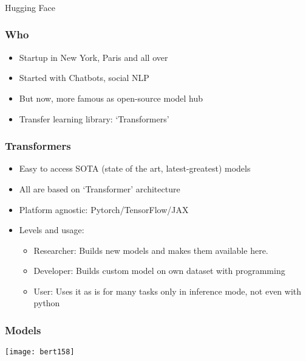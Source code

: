 \begin{frame}[fragile]\frametitle{}
\begin{center}
{\Large Hugging Face}
\end{center}
\end{frame}

\begin{frame}[fragile]\frametitle{Who}
		\begin{itemize}
		\item Startup in New York, Paris and all over
		\item Started with Chatbots, social NLP
		\item But now, more famous as open-source model hub
		\item Transfer learning library: `Transformers'
		\end{itemize}
\end{frame}

\begin{frame}[fragile]\frametitle{Transformers}
		\begin{itemize}
		\item Easy to access SOTA (state of the art, latest-greatest) models
		\item All are based on ‘Transformer’ architecture
		\item Platform agnostic: Pytorch/TensorFlow/JAX
		\item Levels and usage:
				\begin{itemize}
				\item Researcher: Builds new models and makes them available here.
				\item Developer: Builds custom model on own dataset with programming
				\item User: Uses it as is for many tasks only in inference mode, not even with python
				\end{itemize}

		\end{itemize}
\end{frame}

\begin{frame}[fragile]\frametitle{Models}
			\begin{center}
			\texttt{[image: bert158]}
			\end{center}	
\end{frame}

